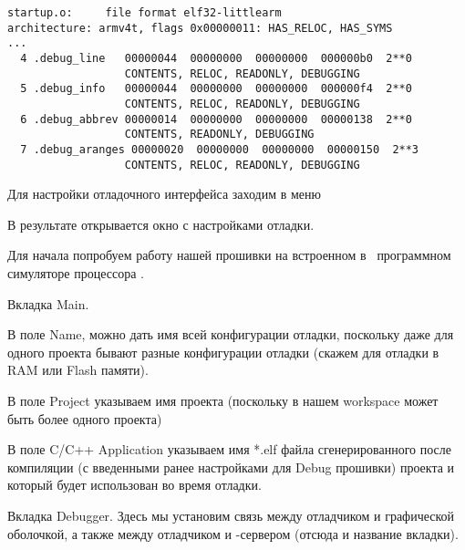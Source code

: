 \begin{lstlisting}[title=startup.o.dump]
startup.o:     file format elf32-littlearm
architecture: armv4t, flags 0x00000011: HAS_RELOC, HAS_SYMS
...
  4 .debug_line   00000044  00000000  00000000  000000b0  2**0
                  CONTENTS, RELOC, READONLY, DEBUGGING
  5 .debug_info   00000044  00000000  00000000  000000f4  2**0
                  CONTENTS, RELOC, READONLY, DEBUGGING
  6 .debug_abbrev 00000014  00000000  00000000  00000138  2**0
                  CONTENTS, READONLY, DEBUGGING
  7 .debug_aranges 00000020  00000000  00000000  00000150  2**3
                  CONTENTS, RELOC, READONLY, DEBUGGING
\end{lstlisting}   

\bigskip
Для настройки отладочного интерфейса заходим в меню



В результате открывается окно с настройками отладки.

\bigskip
Для начала попробуем работу нашей прошивки на встроенном в \gdb\ программном
симуляторе процессора .

\bigskip
Вкладка Main.

\bigskip
В поле Name, можно дать имя всей конфигурации отладки, поскольку даже для одного
проекта бывают разные конфигурации отладки (скажем для отладки в RAM или Flash
памяти).


В поле Project указываем имя проекта (поскольку в нашем workspace может быть
более одного проекта)


В поле C/C++ Application указываем имя *.elf файла сгенерированного после
компиляции (с введенными ранее настройками для Debug прошивки) проекта и который
будет использован во время отладки.





\bigskip
Вкладка Debugger. Здесь мы установим связь между отладчиком и графической
оболочкой, а также между отладчиком и \gdb-сервером (отсюда и название вкладки).

